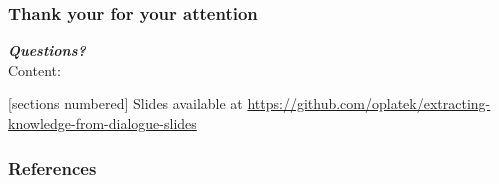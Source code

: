 \documentclass[10pt, compress,british,xcolor={svgnames,dvipsnames,x11names},trans]{beamer}
\begin{document}
\begin{frame}\frametitle{Thank your for your attention}
    {\bf \large \it Questions?} \\
    \vfill
    Content:

  [sections numbered]
  \tableofcontents
    \vfill
    {\footnotesize Slides available at \url{https://github.com/oplatek/extracting-knowledge-from-dialogue-slides}}

\end{frame}

\appendix

\begin{frame}[allowframebreaks]
        \frametitle{References}
        
        
\end{frame}
\end{document}
